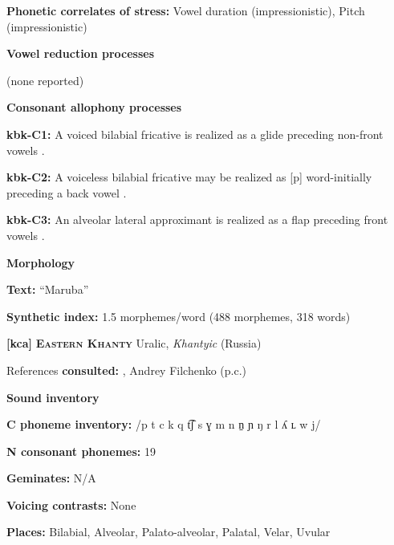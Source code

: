 \textbf{Phonetic correlates of stress:} Vowel duration (impressionistic), Pitch (impressionistic)



\textbf{Vowel reduction processes}



(none reported)



\textbf{Consonant allophony processes}



\textbf{kbk-C1:} A voiced bilabial fricative is realized as a glide preceding non-front vowels \citep{Dutton1996}.



\textbf{kbk-C2:} A voiceless bilabial fricative may be realized as [p] word-initially preceding a back vowel \citep{Dutton1996}.



\textbf{kbk-C3:} An alveolar lateral approximant is realized as a flap preceding front vowels \citep{Dutton1996}.



\textbf{Morphology}



\textbf{Text:} “Maruba” \citep[72-76]{Dutton1996}



\textbf{Synthetic index:} 1.5 morphemes/word (488 morphemes, 318 words)



\textbf{[kca]}   \textbf{\textsc{Eastern Khanty}}  Uralic, \textit{Khantyic} (Russia)



References \textbf{consulted:} \citet{Filchenko2007}, Andrey Filchenko (p.c.)



\textbf{Sound inventory}



\textbf{C phoneme inventory:} /p t c k q t͡ʃ s ɣ m n n̠ ɲ ŋ r l ʎ ʟ w j/



\textbf{N consonant phonemes:} 19



\textbf{Geminates:} N/A



\textbf{Voicing contrasts:} None



\textbf{Places:} Bilabial, Alveolar, Palato-alveolar, Palatal, Velar, Uvular



